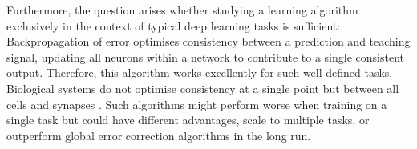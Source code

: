 Furthermore, the question arises whether studying a learning algorithm exclusively in the context of typical deep learning tasks is sufficient:
Backpropagation of error optimises consistency between a prediction and teaching signal, updating all neurons within a network to contribute to a single consistent output. Therefore, this algorithm works excellently for such well-defined tasks.
Biological systems do not optimise consistency at a single point but between all cells and synapses .
Such algorithms might perform worse when training on a single task but could have different advantages, scale to multiple tasks, or outperform global error correction algorithms in the long run.





\begin{comment}
\section{Representation Learning}\seclbl{visual_rep_learning}


\end{comment}
